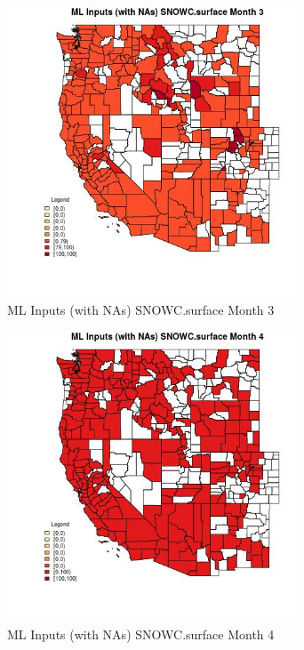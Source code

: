 \clearpage 

\begin{figure} 
\centering  
\includegraphics[width=0.77\textwidth]{Code_Outputs/Report_ML_input_PM25_Step4_part_e_de_duplicated_aves_compiled_2019-05-21wNAs_CountySNOWCsurfacemedianMonth3.jpg} 
\caption{\label{fig:Report_ML_input_PM25_Step4_part_e_de_duplicated_aves_compiled_2019-05-21wNAsCountySNOWCsurfacemedianMonth3}ML Inputs (with NAs) SNOWC.surface Month 3} 
\end{figure} 
 

\begin{figure} 
\centering  
\includegraphics[width=0.77\textwidth]{Code_Outputs/Report_ML_input_PM25_Step4_part_e_de_duplicated_aves_compiled_2019-05-21wNAs_CountySNOWCsurfacemedianMonth4.jpg} 
\caption{\label{fig:Report_ML_input_PM25_Step4_part_e_de_duplicated_aves_compiled_2019-05-21wNAsCountySNOWCsurfacemedianMonth4}ML Inputs (with NAs) SNOWC.surface Month 4} 
\end{figure} 
 

